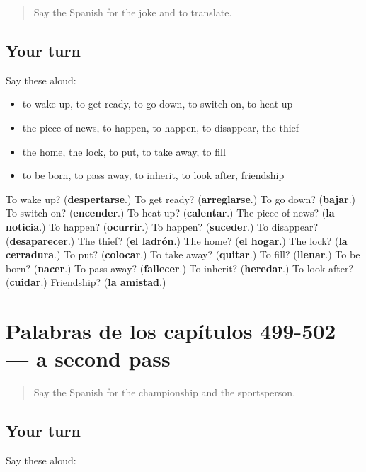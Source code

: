 \begin{quote}
Say the Spanish for the joke and to translate.
\end{quote}

\subsection*{Your turn}
Say these aloud:

\begin{itemize}
\raggedright
  \item to wake up, to get ready, to go down, to switch on, to heat up
  \item the piece of news, to happen, to happen, to disappear, the thief
  \item the home, the lock, to put, to take away, to fill
  \item to be born, to pass away, to inherit, to look after, friendship
\end{itemize}

\begin{tcolorbox}[breakable,colback=teal!4,colframe=teal!35!black,title={Before you move on}]
To wake up? (\textbf{despertarse}.) To get ready? (\textbf{arreglarse}.) To go down? (\textbf{bajar}.) To switch on? (\textbf{encender}.) To heat up? (\textbf{calentar}.) The piece of news? (\textbf{la noticia}.) To happen? (\textbf{ocurrir}.) To happen? (\textbf{suceder}.) To disappear? (\textbf{desaparecer}.) The thief? (\textbf{el ladrón}.) The home? (\textbf{el hogar}.) The lock? (\textbf{la cerradura}.) To put? (\textbf{colocar}.) To take away? (\textbf{quitar}.) To fill? (\textbf{llenar}.) To be born? (\textbf{nacer}.) To pass away? (\textbf{fallecer}.) To inherit? (\textbf{heredar}.) To look after? (\textbf{cuidar}.) Friendship? (\textbf{la amistad}.)
\end{tcolorbox}
\section[(dialogue)]{Palabras de los capítulos 499-502 — a second pass}

\label{lesson:ES-R502-repaso-palabras-de-los-capitulos-499-502}



\begin{quote}
Say the Spanish for the championship and the sportsperson.
\end{quote}

\subsection*{Your turn}
Say these aloud:

